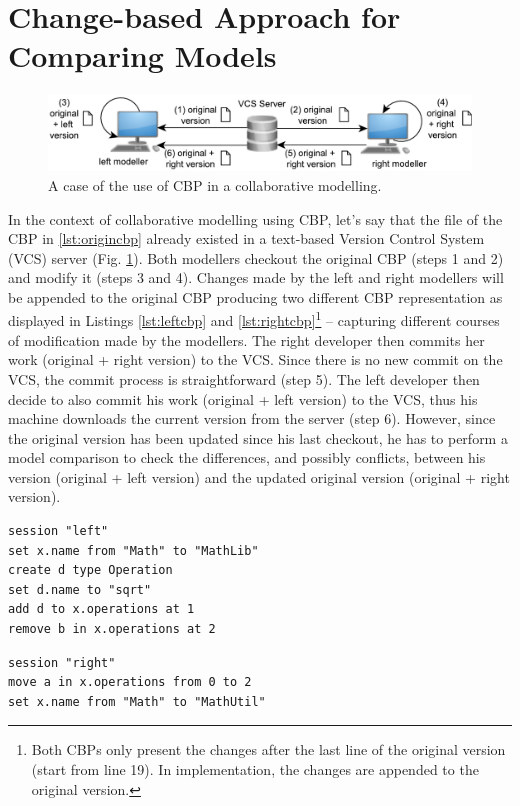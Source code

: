 \documentclass{llncs}
\begin{document}
\section{Change-based Approach for Comparing Models}
\label{sec:change_based_approach_for_comparing_models}

 \begin{figure}
    \includegraphics[width=\linewidth]{images/VCS}
    \caption{A case of the use of CBP in a collaborative modelling.}
    \label{fig:vcs}
\end{figure}

In the context of collaborative modelling using CBP, let's say that the file of the CBP in \ref{lst:origincbp} already existed in a text-based Version Control System (VCS) server (Fig. \ref{fig:vcs}). Both modellers checkout the original CBP (steps 1 and 2) and modify it (steps 3 and 4). Changes made by the left and right modellers will be appended to the original CBP producing two different CBP representation as displayed in Listings \ref{lst:leftcbp} and \ref{lst:rightcbp}\footnote{Both CBPs only present the changes after the last line of the original version (start from line 19). In implementation, the changes are appended to the original version.} -- capturing different courses of modification made by the modellers. The right developer then commits her work (original + right version) to the VCS. Since there is no new commit on the VCS, the commit process is straightforward (step 5). The left developer then decide to also commit his work (original + left version) to the VCS, thus his machine downloads the current version from the server (step 6). However, since the original version has been updated since his last checkout, he has to perform a model comparison to check the differences, and possibly conflicts, between his version (original + left version) and the updated original version (original + right version). 

\begin{minipage}[t]{0.49\linewidth}    
\begin{lstlisting}[firstnumber=19,style=eol,caption={The CBP of the model in Fig. \ref{fig:left} (left version).},label=lst:leftcbp]
session "left"
set x.name from "Math" to "MathLib"
create d type Operation
set d.name to "sqrt"
add d to x.operations at 1
remove b in x.operations at 2
\end{lstlisting}
\end{minipage}
\hfill
\begin{minipage}[t]{0.49\linewidth}
\begin{lstlisting}[firstnumber=19,style=eol,caption={The CBP of the model in Fig. \ref{fig:right} (right version).},label=lst:rightcbp]
session "right"
move a in x.operations from 0 to 2
set x.name from "Math" to "MathUtil"
\end{lstlisting}
\end{minipage}
\end{document}
